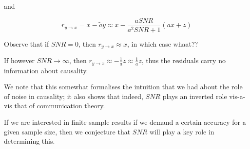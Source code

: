 and

$$
    r_{y \rightarrow x} = x - \tilde{a}y \approx x - \frac{a SNR}{a^2 SNR + 1} (ax + z) 
$$

Observe that if $SNR = 0$, then $r_{y \rightarrow x} \approx x$, in which case whaat??

If however $SNR \rightarrow \infty$, then $r_{y \rightarrow x} \approx -\frac{1}{a}z \approx \frac{1}{a}z$, thus 
the residuals carry no information about causality.

We note that this somewhat formalises the intuition that we had about the role of noise in 
causality; it also shows that indeed, $SNR$ plays an inverted role vis-a-vis that of communication
theory. 

If we are interested in finite sample results if we demand a certain accuracy for a given
sample size, then we conjecture that $SNR$ will play a key role in determining this.
